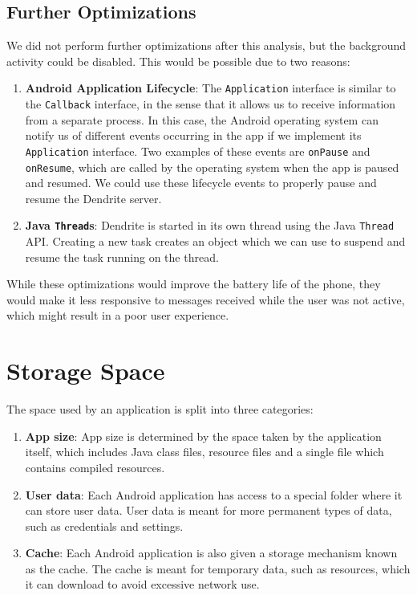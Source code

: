 \subsection{Further Optimizations}
We did not perform further optimizations after this analysis, but the background activity could be disabled.
This would be possible due to two reasons:
\begin{enumerate}
	\item{
	      \textbf{Android Application Lifecycle}:
	      The \texttt{Application} interface is similar to the \texttt{Callback} interface, in the sense that it allows us to receive information from a separate process.
	      In this case, the Android operating system can notify us of different events occurring in the app if we implement its \texttt{Application} interface.
	      Two examples of these events are \texttt{onPause} and \texttt{onResume}, which are called by the operating system when the app is paused and resumed.
	      We could use these lifecycle events to properly pause and resume the Dendrite server.
	      }
	\item{
	      \textbf{Java \texttt{Thread}s}:
	      Dendrite is started in its own thread using the Java \texttt{Thread} \ac{API}\@.
	      Creating a new task creates an object which we can use to suspend and resume the task running on the thread.
	      }
\end{enumerate}

While these optimizations would improve the battery life of the phone, they would make it less responsive to messages received while the user was not active, which might result in a poor user experience.

\section{Storage Space}\label{sec:storage_space}
The space used by an application is split into three categories:
\begin{enumerate}
	\item{
	      \textbf{App size}:
	      App size is determined by the space taken by the application itself, which includes Java class files, resource files and a single file which contains compiled resources\cite{android_devdocs_apksize}.
	      }
	\item{
	      \textbf{User data}:
	      Each Android application has access to a special folder where it can store user data.
	      User data is meant for more permanent types of data, such as credentials and settings.
	      }
	\item{
	      \textbf{Cache}:
	      Each Android application is also given a storage mechanism known as the cache.
	      The cache is meant for temporary data, such as resources, which it can download to avoid excessive network use.
	      }
\end{enumerate}

